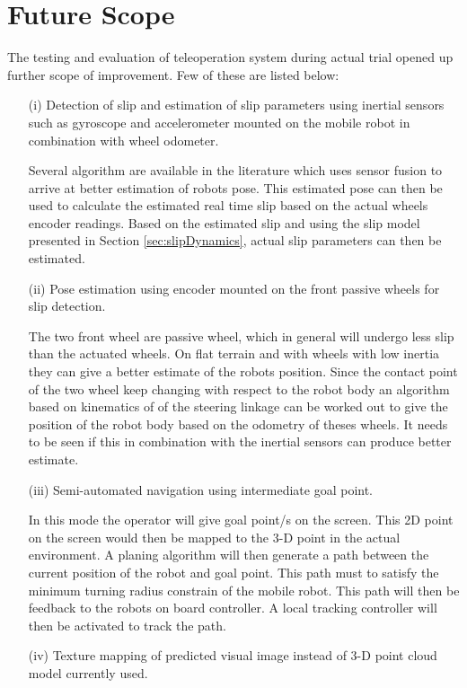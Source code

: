 \section{Future Scope }
The testing and evaluation of teleoperation system during actual trial opened up  further scope of improvement. Few of these are listed below:  
\begin{itemize}
	\item [(i)] Detection of slip and estimation of slip parameters using inertial sensors such as gyroscope and accelerometer  mounted on the mobile robot  in combination with wheel odometer. 
	
	Several algorithm are available in the literature which uses sensor fusion to arrive at better estimation of robots pose. This estimated pose can then be used to calculate the estimated real time slip based on the actual wheels encoder readings. Based on the estimated slip and using the slip model presented in Section \ref{sec:slipDynamics}, actual slip parameters can then be estimated. 
	
	\item[(ii)]  Pose estimation using encoder mounted on the front passive wheels for slip detection.
	
	 The two front wheel are passive wheel, which in general will undergo less slip than the actuated wheels. On flat terrain and with wheels with low inertia they can give a better estimate of the robots position. Since the contact point of the two wheel keep changing with respect to the robot body an algorithm based on kinematics of of the steering linkage can be worked out to give the position of the robot body based on the odometry of theses wheels. It needs to be seen if this in combination with the  inertial sensors can produce better estimate.
	
	\item[(iii)] Semi-automated navigation using intermediate goal point.
	
	  In this mode the operator will give goal point/s on the screen. This 2D point on the screen would then be mapped to the 3-D point in the actual environment. A planing algorithm will then generate a path between the current position of the robot and goal point. This path must to satisfy the minimum turning radius constrain of the mobile robot. This path will then be feedback to the robots on board controller. A local tracking controller will then be activated to track the path. 
	
	\item[(iv)] Texture mapping of predicted  visual image instead of 3-D point cloud model currently used. 
	

\end{itemize}
